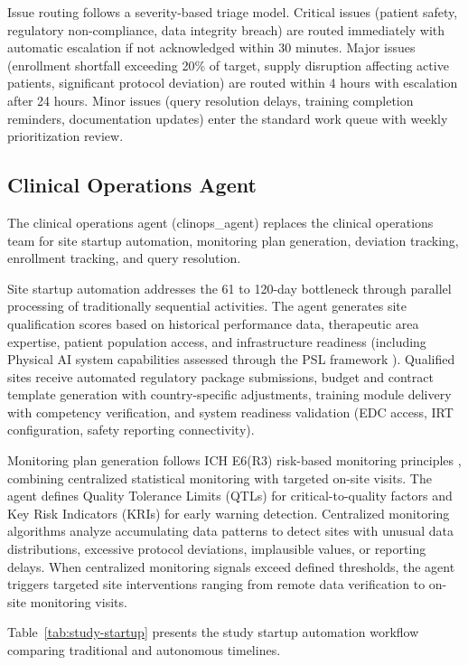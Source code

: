 Issue routing follows a severity-based triage model. Critical issues (patient safety,
regulatory non-compliance, data integrity breach) are routed immediately with automatic
escalation if not acknowledged within 30 minutes. Major issues (enrollment shortfall
exceeding 20\% of target, supply disruption affecting active patients, significant protocol
deviation) are routed within 4 hours with escalation after 24 hours. Minor issues (query
resolution delays, training completion reminders, documentation updates) enter the standard
work queue with weekly prioritization review.

\subsection{Clinical Operations Agent}

The clinical operations agent (clinops\_agent) replaces the clinical operations team for
site startup automation, monitoring plan generation, deviation tracking, enrollment
tracking, and query resolution.

Site startup automation addresses the 61 to 120-day bottleneck through parallel processing
of traditionally sequential activities. The agent generates site qualification scores based
on historical performance data, therapeutic area expertise, patient population access, and
infrastructure readiness (including Physical AI system capabilities assessed through the PSL
framework \cite{national-platform-paper}). Qualified sites receive automated regulatory
package submissions, budget and contract template generation with country-specific
adjustments, training module delivery with competency verification, and system readiness
validation (EDC access, IRT configuration, safety reporting connectivity).

Monitoring plan generation follows ICH E6(R3) risk-based monitoring principles
\cite{ich-e6r3}, combining centralized statistical monitoring with targeted on-site
visits. The agent defines Quality Tolerance Limits (QTLs) for critical-to-quality
factors and Key Risk Indicators (KRIs) for early warning detection. Centralized
monitoring algorithms analyze accumulating data patterns to detect sites with unusual
data distributions, excessive protocol deviations, implausible values, or reporting
delays. When centralized monitoring signals exceed defined thresholds, the agent
triggers targeted site interventions ranging from remote data verification to on-site
monitoring visits.

Table~\ref{tab:study-startup} presents the study startup automation workflow comparing
traditional and autonomous timelines.

